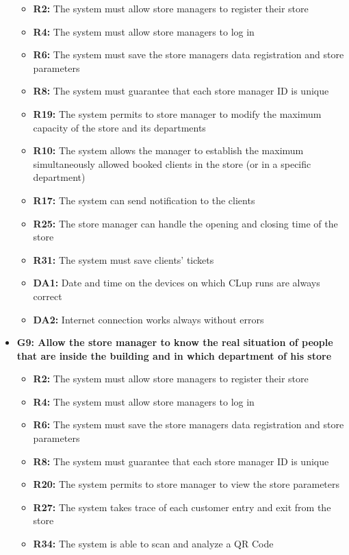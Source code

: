 \documentclass{article}
\begin{document}
\begin{itemize}
			\begin{itemize}
				\item {\bfseries R2:} The system must allow store managers to register their store
				\item {\bfseries R4:} The system must allow store managers to log in
				\item {\bfseries R6:} The system must save the store managers data registration and store parameters
				\item {\bfseries R8:} The system must guarantee that each store manager ID is unique
				\item {\bfseries R19:} The system permits to store manager to modify the maximum capacity of
the store and its departments
				\item {\bfseries R10:} The system allows the manager to establish the maximum simultaneously
allowed booked clients in the store (or in a specific department)
				\item {\bfseries R17:} The system can send notification to the clients
				\item {\bfseries R25:} The store manager can handle the opening and closing time of the store
				\item {\bfseries R31:} The system must save clients’ tickets

			

				\item {\bfseries DA1:} Date and time on the devices on which CLup runs are always correct
				\item {\bfseries DA2:} Internet connection works always without errors
				
				
				\end{itemize}	

\item {\bfseries G9: Allow the store manager to know the real situation of people that are inside the building and in which department of his store}	

			\begin{itemize}
				\item {\bfseries R2:} The system must allow store managers to register their store
				\item {\bfseries R4:} The system must allow store managers to log in
				\item {\bfseries R6:} The system must save the store managers data registration and store parameters
				\item {\bfseries R8:} The system must guarantee that each store manager ID is unique
				\item {\bfseries R20:} The system permits to store manager to view the store parameters
				\item {\bfseries R27:} The system takes trace of each customer entry and exit from the store
				\item {\bfseries R34:} The system is able to scan and analyze a QR Code			
		


\end{itemize}
\end{itemize}
\end{document}
